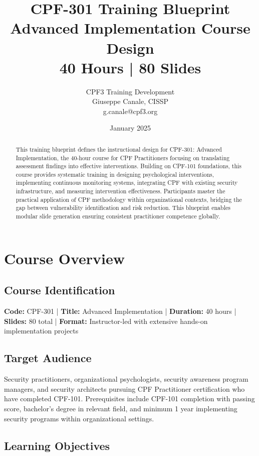 \documentclass[11pt,a4paper]{article}
\title{\textbf{CPF-301 Training Blueprint}\\
\large Advanced Implementation Course Design\\
40 Hours | 80 Slides}
\author{CPF3 Training Development\\
Giuseppe Canale, CISSP\\
\small g.canale@cpf3.org}
\date{January 2025}
\begin{document}
\maketitle

\begin{abstract}
This training blueprint defines the instructional design for CPF-301: Advanced Implementation, the 40-hour course for CPF Practitioners focusing on translating assessment findings into effective interventions. Building on CPF-101 foundations, this course provides systematic training in designing psychological interventions, implementing continuous monitoring systems, integrating CPF with existing security infrastructure, and measuring intervention effectiveness. Participants master the practical application of CPF methodology within organizational contexts, bridging the gap between vulnerability identification and risk reduction. This blueprint enables modular slide generation ensuring consistent practitioner competence globally.
\end{abstract}

\tableofcontents
\newpage

\section{Course Overview}

\subsection{Course Identification}

\textbf{Code:} CPF-301 | \textbf{Title:} Advanced Implementation | \textbf{Duration:} 40 hours | \textbf{Slides:} 80 total | \textbf{Format:} Instructor-led with extensive hands-on implementation projects

\subsection{Target Audience}

Security practitioners, organizational psychologists, security awareness program managers, and security architects pursuing CPF Practitioner certification who have completed CPF-101. Prerequisites include CPF-101 completion with passing score, bachelor's degree in relevant field, and minimum 1 year implementing security programs within organizational settings.

\subsection{Learning Objectives}
\end{document}
